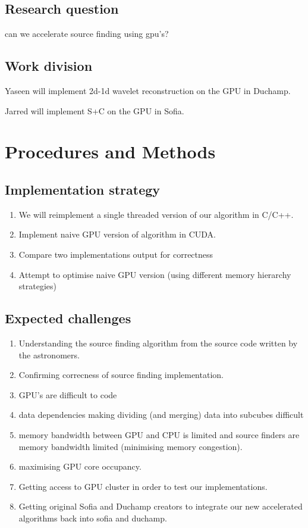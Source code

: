 \documentclass[prodmode,acmtecs]{acmsmall} \usepackage[ruled]{algorithm2e}
\begin{document}
\subsection{Research question} can we accelerate source finding using gpu's?

\subsection{Work division}
Yaseen will implement 2d-1d wavelet reconstruction on the GPU in Duchamp.

Jarred will implement S+C on the GPU in Sofia.

\section{Procedures and Methods}

\subsection{Implementation strategy}
\begin{enumerate}
\item We will reimplement a single threaded version of our algorithm in C/C++.
\item Implement naive GPU version of algorithm in CUDA.
\item Compare two implementations output for correctness
\item Attempt to optimise naive GPU version (using different memory hierarchy strategies)
\end{enumerate}

\subsection{Expected challenges}
\begin{enumerate}
\item Understanding the source finding algorithm from the source code written by the astronomers. 
\item Confirming correcness of source finding implementation.
\item GPU's are difficult to code
\item data dependencies making dividing (and merging) data into subcubes difficult
\item memory bandwidth between GPU and CPU is limited and source finders are memory bandwidth limited (minimising memory congestion).
\item maximising GPU core occupancy.
\item Getting access to GPU cluster in order to test our implementations. 
\item Getting original Sofia and Duchamp creators to integrate our new accelerated algorithms back into sofia and duchamp.
\end{enumerate}
\end{document}
